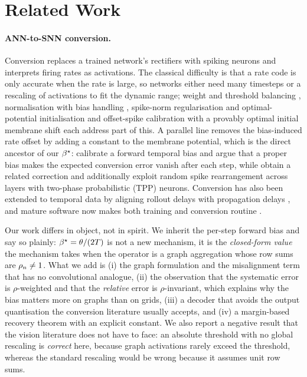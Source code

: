 \section{Related Work}
\label{sec:related}

\paragraph{ANN-to-SNN conversion.}
Conversion replaces a trained network's rectifiers with spiking neurons and interprets firing rates
as activations. The classical difficulty is that a rate code is only accurate when the rate is
large, so networks either need many timesteps or a rescaling of activations to fit the dynamic
range; weight and threshold balancing \citep{diehl2015fast}, normalisation with bias handling
\citep{rueckauer2017conversion}, spike-norm regularisation \citep{sengupta2019going} and
optimal-potential initialisation \citep{bu2022optimal,deng2021optimal} and offset-spike calibration
with a provably optimal initial membrane shift \citep{hao2023offset} each address part of this.
A parallel line removes the bias-induced rate offset by adding a constant to the membrane potential,
which is the direct ancestor of our $\beta^{\star}$: \citet{wu2024ftbc} calibrate a forward temporal bias
and argue that a proper bias makes the expected conversion error vanish after each step, while
\citet{bojkovic2025temporal} obtain a related correction and additionally exploit random spike
rearrangement across layers with two-phase probabilistic (TPP) neurons. Conversion has also been
extended to temporal data by aligning rollout delays with propagation delays
\citep{kugele2020efficient}, and mature software now makes both training and conversion routine
\citep{fang2023spikingjelly}.

Our work differs in object, not in spirit. We inherit the per-step forward bias and say so plainly:
$\beta^{\star} = \theta/(2T)$ is not a new mechanism, it is the \emph{closed-form value} the mechanism
takes when the operator is a graph aggregation whose row sums are $\rho_{n} \neq 1$. What we add is
(i) the graph formulation and the misalignment term that has no convolutional analogue, (ii) the
observation that the systematic error is $\rho$-weighted and that the \emph{relative} error is
$\rho$-invariant, which explains why the bias matters more on graphs than on grids, (iii) a decoder
that avoids the output quantisation the conversion literature usually accepts, and (iv) a
margin-based recovery theorem with an explicit constant. We also report a negative result that the
vision literature does not have to face: an absolute threshold with no global rescaling is
\emph{correct} here, because graph activations rarely exceed the threshold, whereas the standard
rescaling would be wrong because it assumes unit row sums.


